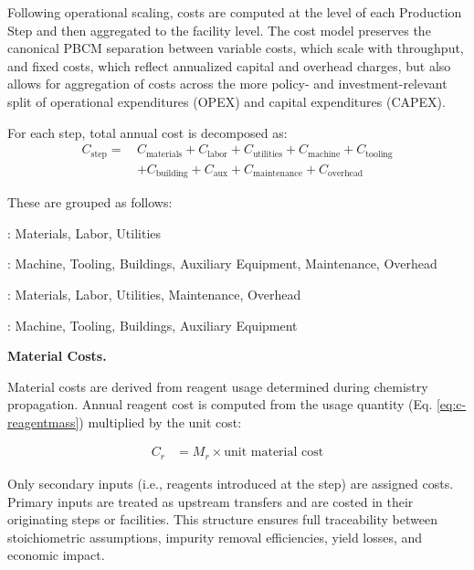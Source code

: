 \documentclass{article}
\renewcommand\_{\textunderscore\allowbreak}
\begin{document}
Following operational scaling, costs are computed at the level of each Production Step and then aggregated to the facility level. The cost model preserves the canonical PBCM separation between variable costs, which scale with throughput, and fixed costs, which reflect annualized capital and overhead charges, but also allows for aggregation of costs across the more policy- and investment-relevant split of operational expenditures (OPEX) and capital expenditures (CAPEX).

For each step, total annual cost is decomposed as:
\begin{align}
    C_{\text{step}} = \, & C_{\text{materials}} + C_{\text{labor}} + C_{\text{utilities}} + 
    C_{\text{machine}} + C_{\text{tooling}} \nonumber \\
    & + C_{\text{building}} + C_{\text{aux}} + C_{\text{maintenance}} + C_{\text{overhead}}
\end{align}

These are grouped as follows:

\begin{description}[noitemsep, topsep=0pt]
    \item[\textbullet\enskip Variable]: Materials, Labor, Utilities
    \item[\textbullet\enskip Fixed]: Machine, Tooling, Buildings, Auxiliary Equipment, Maintenance, Overhead
    \item[\textbullet\enskip OPEX]: Materials, Labor, Utilities, Maintenance, Overhead
    \item[\textbullet\enskip CAPEX]: Machine, Tooling, Buildings, Auxiliary Equipment
\end{description}

\medskip
\noindent\textbf{Material Costs.}\quad

Material costs are derived from reagent usage determined during chemistry propagation. Annual reagent cost is computed from the usage quantity (Eq. \ref{eq:c-reagentmass}) multiplied by the unit cost:

\begin{align}
    C_r &= M_r \times \text{unit material cost}
\end{align}

Only secondary inputs (i.e., reagents introduced at the step) are assigned costs. Primary inputs are treated as upstream transfers and are costed in their originating steps or facilities. This structure ensures full traceability between stoichiometric assumptions, impurity removal efficiencies, yield losses, and economic impact.
\end{document}
